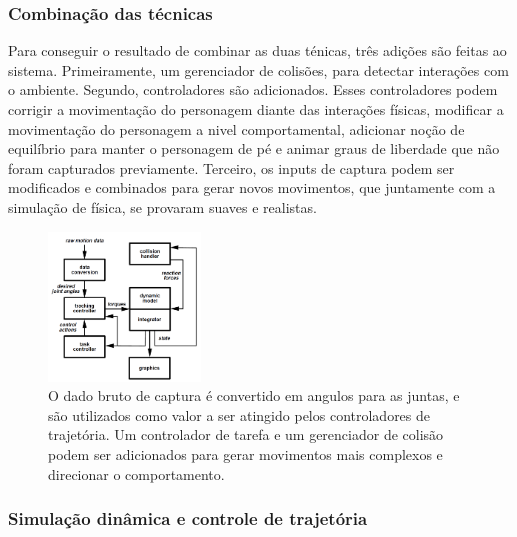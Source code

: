 \subsubsection{Combinação das técnicas}

Para conseguir o resultado de combinar as duas ténicas, três adições são feitas ao sistema. Primeiramente, um gerenciador de colisões, para detectar interações com o ambiente. Segundo, controladores são adicionados. Esses controladores podem corrigir a movimentação do personagem diante das interações físicas, modificar a movimentação do personagem a nivel comportamental, adicionar noção de equilíbrio para manter o personagem de pé e animar graus de liberdade que não foram capturados previamente. Terceiro, os inputs de captura podem ser modificados e combinados para gerar novos movimentos, que juntamente com a simulação de física, se provaram suaves e realistas.

\begin{figure}[ht]
  \centering
  \includegraphics[height=150px]{artigos/1999_Tracking_and_Modifying_Upper-body_Human_Motion_Data_with_Dynamic_Simulation_zordan_TMU/fig_layout.png}
  \caption{O dado bruto de captura é convertido em angulos para as juntas, e são utilizados como valor a ser atingido pelos controladores de trajetória. Um controlador de tarefa e um gerenciador de colisão podem ser adicionados para gerar movimentos mais complexos e direcionar o comportamento.}
  \label{fig:1999:upperbody:fig3}
\end{figure}

\subsubsection{Simulação dinâmica e controle de trajetória}

